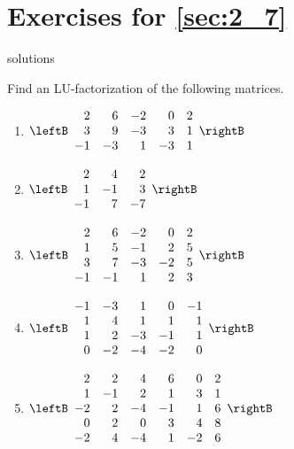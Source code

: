 \section*{Exercises for \ref{sec:2_7}}

\begin{Filesave}{solutions}
\end{Filesave}

\begin{multicols}{2}
\begin{ex}
Find an LU-factorization of the following matrices.

\begin{enumerate}[label={\alph*.}]
\item $\leftB \begin{array}{rrrrr}
2 & 6 & -2 & 0 & 2 \\
3 & 9 & -3 & 3 & 1 \\
-1 & -3 & 1 & -3 & 1
\end{array} \rightB$

\item $\leftB \begin{array}{rrr}
2 & 4 & 2 \\
1 & -1 & 3 \\
-1 & 7 & -7
\end{array} \rightB$

\item $\leftB \begin{array}{rrrrr}
2 & 6 & -2 & 0 & 2 \\
1 & 5 & -1 & 2 & 5 \\
3 & 7 & -3 & -2 & 5 \\
-1 & -1 & 1 & 2 & 3 
\end{array} \rightB$

\item $\leftB \begin{array}{rrrrr}
-1 & -3 & 1 & 0 & -1 \\
1 & 4 & 1 & 1 & 1 \\
1 & 2 & -3 & -1 & 1 \\
0 & -2 & -4 & -2 & 0 
\end{array} \rightB$

\item $\leftB \begin{array}{rrrrrr}
2 & 2 & 4 & 6 & 0 & 2 \\
1 & -1 & 2 & 1 & 3 & 1 \\
-2 & 2 & -4 & -1 & 1 & 6 \\
0 & 2 & 0 & 3 & 4 & 8 \\
-2 & 4 & -4 & 1 & -2 & 6 
\end{array} \rightB$


\end{enumerate}
\end{ex}
\end{multicols}
